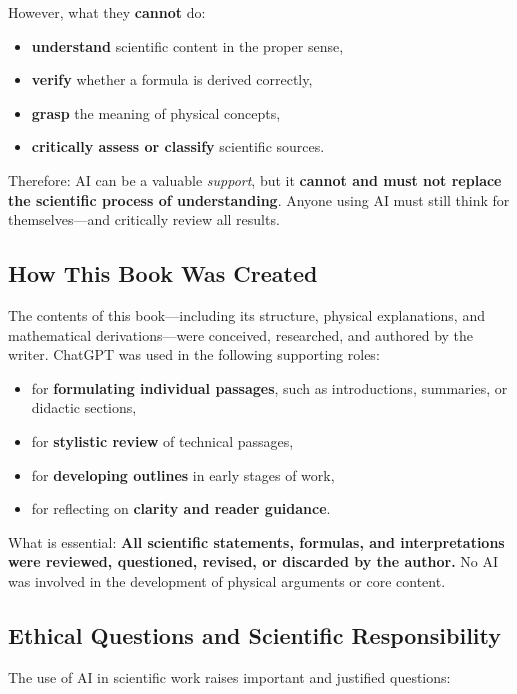 However, what they \textbf{cannot} do:
\begin{itemize}
	\item \textbf{understand} scientific content in the proper sense,
	\item \textbf{verify} whether a formula is derived correctly,
	\item \textbf{grasp} the meaning of physical concepts,
	\item \textbf{critically assess or classify} scientific sources.
\end{itemize}

Therefore: AI can be a valuable \emph{support}, but it \textbf{cannot and must not replace the scientific process of understanding}. Anyone using AI must still think for themselves—and critically review all results.

\subsection*{How This Book Was Created}

The contents of this book—including its structure, physical explanations, and mathematical derivations—were conceived, researched, and authored by the writer. ChatGPT was used in the following supporting roles:

\begin{itemize}
	\item for \textbf{formulating individual passages}, such as introductions, summaries, or didactic sections,
	\item for \textbf{stylistic review} of technical passages,
	\item for \textbf{developing outlines} in early stages of work,
	\item for reflecting on \textbf{clarity and reader guidance}.
\end{itemize}

What is essential: \textbf{All scientific statements, formulas, and interpretations were reviewed, questioned, revised, or discarded by the author.} No AI was involved in the development of physical arguments or core content.

\subsection*{Ethical Questions and Scientific Responsibility}

The use of AI in scientific work raises important and justified questions:

